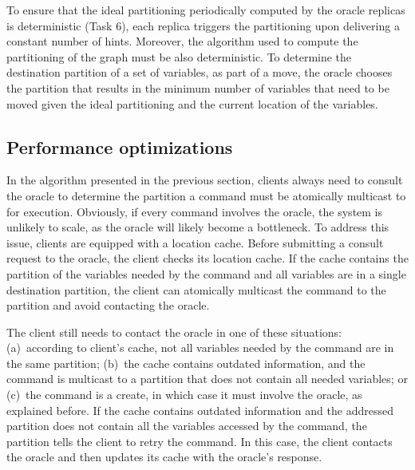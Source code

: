 To ensure that the ideal partitioning periodically computed by the oracle replicas is deterministic (Task 6), each replica triggers the partitioning upon delivering a constant number of hints.
Moreover, the algorithm used to compute the partitioning of the graph must be also deterministic.
To determine the destination partition of a set of variables, as part of a move, the oracle chooses the partition that results in the minimum number of variables that need to be moved given the ideal partitioning and the current location of the variables.

\subsection{Performance optimizations}
\label{sec:optm}

In the algorithm presented in the previous section, clients always need to consult the oracle to determine the partition a command must be atomically multicast to for execution.
Obviously, if every command involves the oracle, the system is unlikely to scale, as the oracle will likely become a bottleneck.
To address this issue, clients are equipped with a location cache.
Before submitting a consult request to the oracle, the client checks its location cache.
If the cache contains the partition of the variables needed by the command and all variables are in a single destination partition, the client can atomically multicast the command to the partition and avoid contacting the oracle. 

The client still needs to contact the oracle in one of these situations:
(a)~according to client's cache, not all variables needed by the command are in the same partition;
(b)~the cache contains outdated information, and the command is multicast to a partition that does not contain all needed variables; or
(c)~the command is a create, in which case it must involve the oracle, as explained before.
If the cache contains outdated information and the addressed partition does not contain all the variables accessed by the command, the partition tells the client to retry the command.
In this case, the client contacts the oracle and then updates its cache with the oracle's response.






